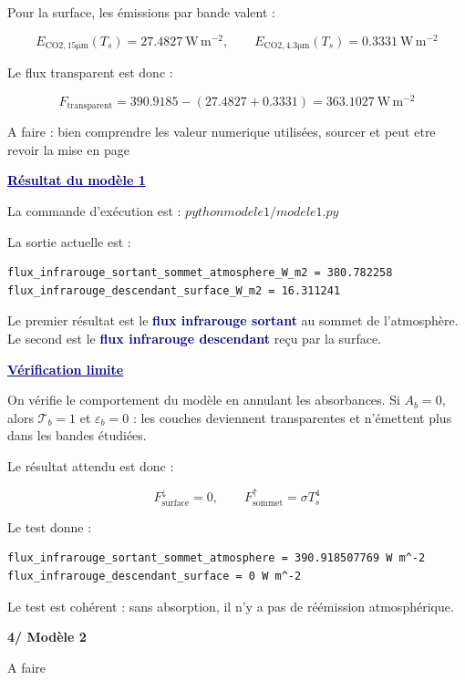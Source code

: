 \documentclass[11pt,a4paper]{article}
\newcommand{\fluxunit}{\mathrm{W\,m^{-2}}}
\newcommand{\motcle}[1]{\textcolor{DarkBlue}{\textbf{#1}}}
\newcommand{\bloc}[1]{\vspace{0.9em}\noindent\textcolor{DarkBlue}{\underline{\textbf{#1}}}\par\vspace{0.35em}}
\newcommand{\partietitre}[1]{%
    \vspace{1.1em}
    {\Large\bfseries\textcolor{DocRed}{#1}}\par
    \vspace{0.35em}
}
\begin{document}
Pour la surface, les émissions par bande valent :

\[
E_{\mathrm{CO2,15\mu m}}(T_s)=27.4827\ \fluxunit,
\qquad
E_{\mathrm{CO2,4.3\mu m}}(T_s)=0.3331\ \fluxunit
\]

Le flux transparent est donc :

\[
F_{\mathrm{transparent}}
=
390.9185-(27.4827+0.3331)
=
363.1027\ \fluxunit
\]

\textcolor{green!50!black}{A faire : bien comprendre les valeur numerique utilisées, sourcer et peut etre revoir la mise en page}

\bloc{Résultat du modèle 1}

La commande d'exécution est : $python modele1/modele1.py$

La sortie actuelle est :

\begin{verbatim}
flux_infrarouge_sortant_sommet_atmosphere_W_m2 = 380.782258
flux_infrarouge_descendant_surface_W_m2 = 16.311241
\end{verbatim}

Le premier résultat est le \motcle{flux infrarouge sortant} au sommet de l'atmosphère. Le second est le \motcle{flux infrarouge descendant} reçu par la surface.

\bloc{Vérification limite}

On vérifie le comportement du modèle en annulant les absorbances. Si $A_b=0$, alors $\mathcal{T}_b=1$ et $\varepsilon_b=0$ : les couches deviennent transparentes et n'émettent plus dans les bandes étudiées.

Le résultat attendu est donc :

\[
F^\downarrow_{\mathrm{surface}} = 0,
\qquad
F^\uparrow_{\mathrm{sommet}} = \sigma T_s^4
\]

Le test donne :

\begin{verbatim}
flux_infrarouge_sortant_sommet_atmosphere = 390.918507769 W m^-2
flux_infrarouge_descendant_surface = 0 W m^-2
\end{verbatim}

Le test est cohérent : sans absorption, il n'y a pas de réémission atmosphérique.

\partietitre{4/ Modèle 2}

\textcolor{green!50!black}{A faire}
\end{document}
